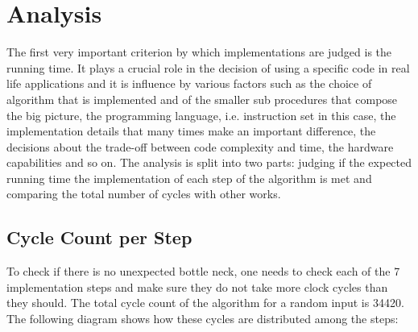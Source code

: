 
\chapter{Analysis}\label{chapter:analysis}

The first very important criterion by which implementations are judged is the running time. It plays a crucial role in the decision of using a specific code in real life applications and it is influence by various factors such as the choice of algorithm that is implemented and of the smaller sub procedures that compose the big picture, the programming language, i.e. instruction set in this case, the implementation details that many times make an important difference, the decisions about the trade-off between code complexity and time, the hardware capabilities and so on. The analysis is split into two parts: judging if the expected running time the implementation of each step of the algorithm is met and comparing the total number of cycles with other works. 

\section{Cycle Count per Step}

To check if there is no unexpected bottle neck, one needs to check each of the 7 implementation steps and make sure they do not take more clock cycles than they should. The total cycle count of the algorithm for a random input is 34420. The following diagram shows how these cycles are distributed among the steps:

\vspace{5mm}


